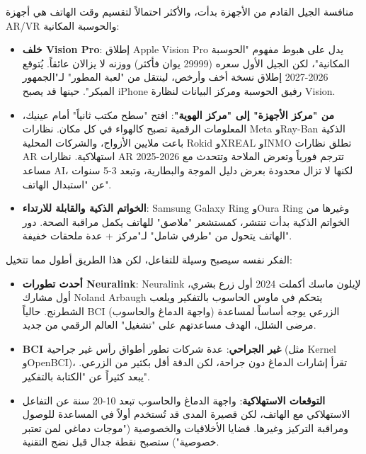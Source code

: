 


منافسة الجيل القادم من الأجهزة بدأت، والأكثر احتمالاً لتقسيم وقت الهاتف هي أجهزة AR/VR والحوسبة المكانية:

\begin{itemize}
  \item \textbf{خلف Vision Pro}: إطلاق Apple Vision Pro يدل على هبوط مفهوم "الحوسبة المكانية"، لكن الجيل الأول سعره (29999 يوان فأكثر) ووزنه لا يزالان عائقاً. يُتوقع 2026-2027 إطلاق نسخة أخف وأرخص، لينتقل من "لعبة المطور" لـ"الجمهور المبكر". حينها قد يصبح iPhone رفيق الحوسبة ومركز البيانات لنظارة Vision.
  \item \textbf{من "مركز الأجهزة" إلى "مركز الهوية"}: افتح "سطح مكتب ثانياً" أمام عينيك، المعلومات الرقمية تصبح كالهواء في كل مكان. نظارات Meta وRay-Ban الذكية باعت ملايين الأزواج، والشركات المحلية Rokid وXREAL وINMO تطلق نظارات AR استهلاكية. نظارات AR 2025-2026 تترجم فورياً وتعرض الملاحة وتتحدث مع مساعد AI، لكنها لا تزال محدودة بعرض دليل الموجة والبطارية، وتبعد 3-5 سنوات عن "استبدال الهاتف".
  \item \textbf{الخواتم الذكية والقابلة للارتداء}: Samsung Galaxy Ring وOura Ring وغيرها من الخواتم الذكية بدأت تنتشر، كمستشعر "ملاصق" للهاتف يكمل مراقبة الصحة. دور الهاتف يتحول من "طرفي شامل" لـ"مركز + عدة ملحقات خفيفة".
\end{itemize}


الفكر نفسه سيصبح وسيلة للتفاعل، لكن هذا الطريق أطول مما تتخيل:

\begin{itemize}
  \item \textbf{أحدث تطورات Neuralink}: Neuralink لإيلون ماسك أكملت 2024 أول زرع بشري، أول مشارك Noland Arbaugh يتحكم في ماوس الحاسوب بالتفكير ويلعب الشطرنج. حالياً BCI (واجهة الدماغ والحاسوب) الزرعي يوجه أساساً لمساعدة مرضى الشلل، الهدف مساعدتهم على "تشغيل" العالم الرقمي من جديد.
  \item \textbf{BCI غير الجراحي}: عدة شركات تطور أطواق رأس غير جراحية (مثل Kernel وOpenBCI)، تقرأ إشارات الدماغ دون جراحة، لكن الدقة أقل بكثير من الزرعي. يبعد كثيراً عن "الكتابة بالتفكير".
  \item \textbf{التوقعات الاستهلاكية}: واجهة الدماغ والحاسوب تبعد 10-20 سنة عن التفاعل الاستهلاكي مع الهاتف، لكن قصيرة المدى قد تُستخدم أولاً في المساعدة للوصول ومراقبة التركيز وغيرها. قضايا الأخلاقيات والخصوصية ("موجات دماغي لمن تعتبر خصوصية") ستصبح نقطة جدال قبل نضج التقنية.
\end{itemize}

